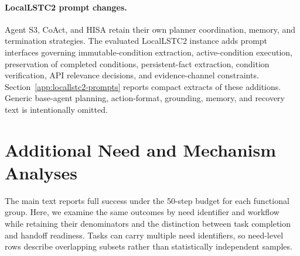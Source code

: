 \documentclass[11pt]{article}
\begin{document}
\paragraph{LocalLSTC2 prompt changes.}
Agent S3, CoAct, and HISA retain their own planner coordination, memory, and termination strategies. The evaluated LocalLSTC2 instance adds prompt interfaces governing immutable-condition extraction, active-condition execution, preservation of completed conditions, persistent-fact extraction, condition verification, API relevance decisions, and evidence-channel constraints. Section~\ref{app:locallstc2-prompts} reports compact extracts of these additions. Generic base-agent planning, action-format, grounding, memory, and recovery text is intentionally omitted.

\section{Additional Need and Mechanism Analyses}
\label{app:needanalysis}


The main text reports full success under the 50-step budget for each functional group. Here, we examine the same outcomes by need identifier and workflow while retaining their denominators and the distinction between task completion and handoff readiness. Tasks can carry multiple need identifiers, so need-level rows describe overlapping subsets rather than statistically independent samples.

\begin{table}[t]
\centering
\small
{}
\caption{Baseline distinct-component diagnostics (\%). The handoff-gap rate uses all 55 distinct-component tasks. Conditional readiness uses the method-specific $n_{T=1}$ denominator shown in the final column.}
\label{tab:baseline-handoff-diagnostic}
\end{table}
\end{document}
